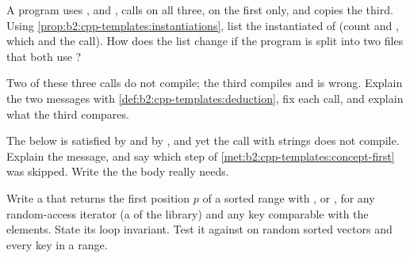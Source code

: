 \begin{exercise}[$\star$]\label{exo:b2:cpp-templates:4}
A program uses ,  and , calls  on all three,
 on the first only, and copies the third. Using \cref{prop:b2:cpp-templates:instantiations}, list the
instantiated  of  (count  and , which  and the
 call). How does the list change if the program is split into two files that both use
?
\end{exercise}

\begin{exercise}[$\star\star$]\label{exo:b2:cpp-templates:5}
Two of these three calls do not compile; the third compiles and is wrong. Explain the two messages with
\cref{def:b2:cpp-templates:deduction}, fix each call, and explain what the third compares.
\end{exercise}

\begin{exercise}[$\star\star$]\label{exo:b2:cpp-templates:6}
The  below is satisfied by  and by , and yet the call with strings does not
compile. Explain the message, and say which step of \cref{met:b2:cpp-templates:concept-first} was skipped. Write the
 the body really needs.
\end{exercise}

\begin{exercise}[$\star\star$]\label{exo:b2:cpp-templates:7}
Write a   that returns the first position $p$ of a sorted
range with , or , for any random-access iterator (a  of the library) and any key
comparable with the elements. State its loop invariant. Test it against  on random sorted
vectors and every key in a range.
\end{exercise}

